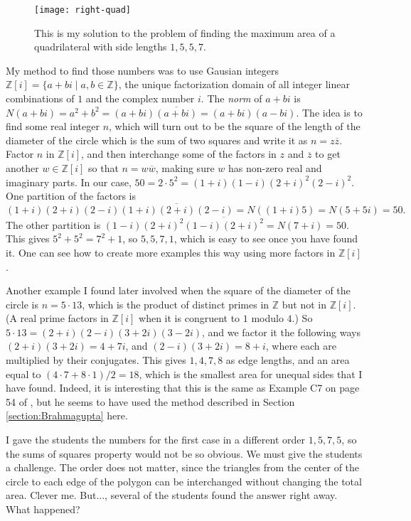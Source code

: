 \documentclass[11pt]{article}
\numberwithin{equation}{section}
\numberwithin{figure}{section}
\newcommand{\Z}{\mathbb Z}
\begin{document}
 \begin{figure}[!htb]
    \centering
        \texttt{[image: right-quad]}%
        \captionsetup{labelsep=colon,margin=2cm}
         \caption{This is my solution to the problem of finding the maximum area of a quadrilateral with side lengths $1,5,5,7$.}\label{fig:right-quad}
    \end{figure}
My method to find those numbers was to use Gausian integers $\Z[i] =\{a+bi \mid a, b \in \Z \}$, the unique factorization domain of all integer linear combinations of $1$ and the complex number $i$.  The \emph{norm} of $a+bi$ is $N(a+bi)=a^2 + b^2=(a+bi)\overline{(a+bi)}=(a+bi)(a-bi)$. The idea is to find some real integer $n$, which will turn out to be the square of the length of the diameter of the circle  which is the sum of two squares and write it as $ n= z\overline{z}$. Factor $n$ in $\Z[i]$, and then interchange some of the factors in $z$ and $\overline{z}$ to get another $w \in \Z[i]$ so that $n= w\overline{w}$, making sure $w$ has non-zero real and imaginary parts.  In our case, $50= 2\cdot 5^2= (1+i)(1-i)(2+i)^2(2-i)^2$.  One partition of the factors is $(1+i)(2+i)(2-i)\overline{(1+i)(2+i)(2-i)}=N((1+i)5)=N(5+5i)=50.$  The other partition  is $(1-i)(2+i)^2\overline{(1-i)(2+i)^2}=N(7+i)=50.$  This gives $5^2 +5^2=7^2+1$, so $5,5,7,1$, which is easy to see once you have found it.  One can see how to create more examples this way using more factors in $\Z[i]$.

Another example I found later involved when the square of the diameter of the circle is $n=5\cdot 13$, which is the product of distinct primes in $\Z$ but not in $\Z[i]$.  (A real prime factors in $\Z[i]$ when it  is congruent to $1$ modulo $4$.) So $5\cdot 13=(2+i)(2-i)(3+2i)(3-2i)$, and we factor it the following ways $(2+i)(3+2i)=4+7i$, and $(2-i)(3+2i)=8+i$, where each are multiplied by their conjugates.  This gives $1,4,7,8$ as edge lengths, and an area equal to $(4\cdot7+8\cdot 1)/2=18$, which is the smallest area for unequal sides that I have found.  Indeed, it is interesting that this is the same as Example C7 on page 54 of \cite{Niven-max-min}, but he seems to have used the method described in Section \ref{section:Brahmagupta} here.


I gave the students the numbers for the first case in a different order $1, 5, 7, 5$, so the sums of squares property would not be so obvious.  We must give the students a challenge.  The order does not matter, since the triangles from the center of the circle to each edge of the polygon can be interchanged without changing the total area.   Clever me.  But..., several of the students found the answer right away.  What happened? 
\end{document}
